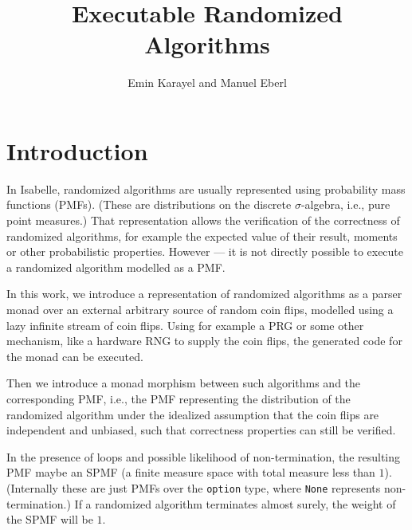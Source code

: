 \documentclass[11pt,a4paper]{article}
\begin{document}
\title{Executable Randomized Algorithms}
\author{Emin Karayel and Manuel Eberl}
\maketitle


\tableofcontents

\section{Introduction}
In Isabelle, randomized algorithms are usually represented using probability mass functions (PMFs). 
(These are distributions on the discrete $\sigma$-algebra, i.e., pure point measures.) That 
representation allows the verification of the correctness of randomized algorithms, for example
the expected value of their result, moments or other probabilistic properties. However --- it is not 
directly possible to execute a randomized algorithm modelled as a PMF.

In this work, we introduce a representation of randomized algorithms as a parser monad over an 
external arbitrary source of random coin flips, modelled using a lazy infinite stream of coin flips.
Using for example a PRG or some other mechanism, like a hardware RNG to supply the coin flips, the
generated code for the monad can be executed.

Then we introduce a monad morphism between such algorithms and the corresponding PMF, i.e., the PMF
representing the distribution of the randomized algorithm under the idealized assumption that the 
coin flips are independent and unbiased, such that correctness properties can still be verified.

In the presence of loops and possible likelihood of non-termination, the resulting PMF maybe an
SPMF (a finite measure space with total measure less than $1$). (Internally these are just PMFs over
the \verb+option+ type, where \verb+None+ represents non-termination.) If a randomized algorithm 
terminates almost surely, the weight of the SPMF will be $1$.
\end{document}
